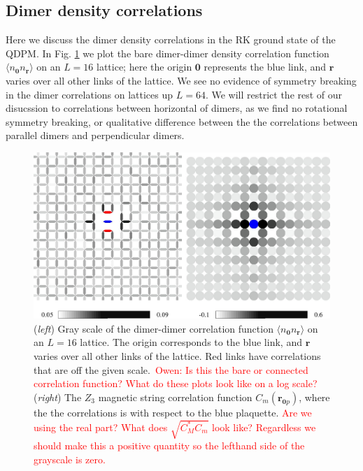 \documentclass[twocolumn,prb,aps,floatfix,superscriptaddress]{revtex4-1}
\newcommand{\figref}[1]{Fig. \ref{#1}}
\newcommand{\note}[1]{\textcolor{red}{#1}}
\begin{document}
\subsection{Dimer density correlations}

Here we discuss the dimer density correlations in the RK ground state of the QDPM. In \figref{fig:dimer_vison_heatmap} we plot the bare dimer-dimer density correlation function $\langle n_{\bm{0}} n_{\bm{r}}\rangle$ on an $L=16$ lattice; here the origin $\bm{0}$ represents the blue link, and $\bm{r}$ varies over all other links of the lattice. We see no evidence of symmetry breaking in the dimer correlations on lattices up $L=64$. We will restrict the rest of our disucssion to correlations between horizontal of dimers, as we find no rotational symmetry breaking, or qualitative difference between the the correlations between parallel dimers and perpendicular dimers.

    \begin{figure}
        \centering
        \includegraphics[width=1.0\columnwidth]{dimer_gry_scale_qdpm.pdf}
        \caption{({\it left}) Gray scale of the dimer-dimer correlation function $\langle n_{\bm{0}} n_{\bm{r}}\rangle$ on an $L=16$ lattice. The origin corresponds to the blue link, and $\bm{r}$ varies over all other links of the lattice. Red links have correlations that are off the given scale.~\note{Owen: Is this the bare or connected correlation function? What do these plots look like on a log scale?} ({\it right}) The $Z_3$ magnetic string correlation function $C_m(\bm{r}_{\bm{0}p})$, where the the correlations is with respect to the blue plaquette. \note{Are we using the real part? What does $\sqrt{C_M^*C_m}$ look like? Regardless we should make this a positive quantity so the lefthand side of the grayscale is zero.}}
        \label{fig:dimer_vison_heatmap}
    \end{figure}
\end{document}
